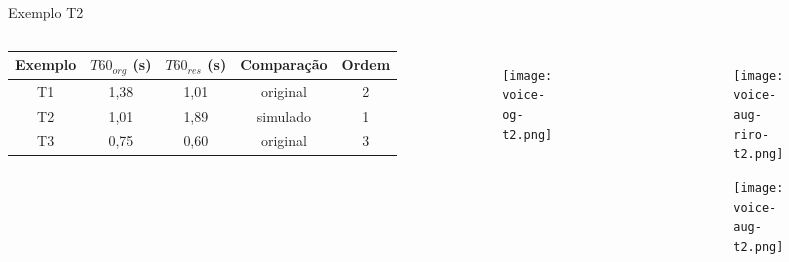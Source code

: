\begin{frame}{Exemplo T2}
    \begin{columns}
        
        \begin{table} [H]
            \begin{adjustbox}{width=\columnwidth,center}
                \begin{tabular}{c|c|c|c|c}
            
                    \textbf{Exemplo} & 
                    \textbf{$T60_{org}$ (s)} & 
                    \textbf{$T60_{res}$ (s)} & 
                    \textbf{Comparação} &
                    \textbf{Ordem} \\
                    \hline 
            
                    T1 & 1,38 & 1,01 & original & 2 \\
                    T2 & 1,01 & 1,89 & simulado & 1 \\
                    T3 & 0,75 & 0,60 & original & 3 \\
            
                \end{tabular}
            \end{adjustbox}
        \end{table}

        \begin{figure}
            \begin{subfigure}{\textwidth}
                \centering
                \texttt{[image: voice-og-t2.png]}
            \end{subfigure}
        \end{figure}

        \begin{figure}
            \begin{subfigure}{\textwidth}
                \centering
                \texttt{[image: voice-aug-riro-t2.png]}
            \end{subfigure}
            \begin{subfigure}{\textwidth}
                \centering
                \texttt{[image: voice-aug-t2.png]}
            \end{subfigure}
        \end{figure}
    \end{columns}
\end{frame}

